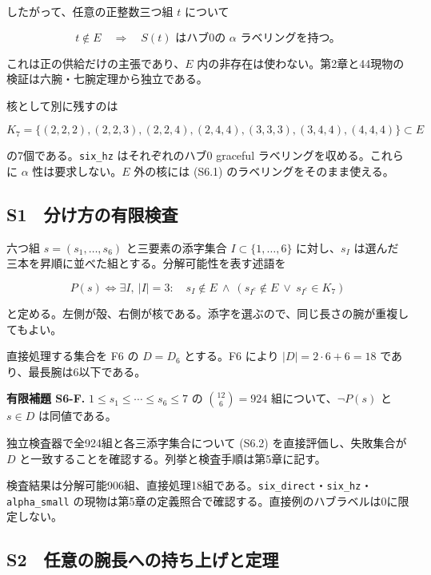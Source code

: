 \documentclass[
  10pt,
  a4paper,
]{article}
\begin{document}
したがって、任意の正整数三つ組 \(t\) について

\[
t\notin E\quad\Longrightarrow\quad
S(t)\text{ はハブ0の }\alpha\text{ ラベリングを持つ。} \tag{S6.1}
\]

これは正の供給だけの主張であり、\(E\)
内の非存在は使わない。第2章と44現物の検証は六腕・七腕定理から独立である。

核として別に残すのは

\[
K_7=\{(2,2,2),(2,2,3),(2,2,4),(2,4,4),
(3,3,3),(3,4,4),(4,4,4)\}\subset E
\]

の7個である。\texttt{six\_hz} はそれぞれのハブ0 graceful
ラベリングを収める。これらに \(\alpha\) 性は要求しない。\(E\) 外の核には
(S6.1) のラベリングをそのまま使える。

\subsection{S1　分け方の有限検査}\label{s1-ux5206ux3051ux65b9ux306eux6709ux9650ux691cux67fb}

六つ組 \(s=(s_1,\ldots,s_6)\) と三要素の添字集合
\(I\subset\{1,\ldots,6\}\) に対し、\(s_I\)
は選んだ三本を昇順に並べた組とする。分解可能性を表す述語を

\[
P(s)\iff\exists I,\ |I|=3:\quad
s_I\notin E\ \land\ (s_{I^c}\notin E\ \lor\ s_{I^c}\in K_7) \tag{S6.2}
\]

と定める。左側が殻、右側が核である。添字を選ぶので、同じ長さの腕が重複してもよい。

直接処理する集合を F6 の \(D=D_6\) とする。F6 により
\(|D|=2\cdot6+6=18\) であり、最長腕は6以下である。

\textbf{有限補題 S6-F.} \(1\le s_1\le\cdots\le s_6\le7\) の
\(\binom{12}{6}=924\) 組について、\(\neg P(s)\) と \(s\in D\)
は同値である。

独立検査器で全924組と各三添字集合について (S6.2)
を直接評価し、失敗集合が \(D\)
と一致することを確認する。列挙と検査手順は第5章に記す。

検査結果は分解可能906組、直接処理18組である。\texttt{six\_direct}・\texttt{six\_hz}・\texttt{alpha\_small}
の現物は第5章の定義照合で確認する。直接例のハブラベルは0に限定しない。

\subsection{S2　任意の腕長への持ち上げと定理}\label{s2-ux4efbux610fux306eux8155ux9577ux3078ux306eux6301ux3061ux4e0aux3052ux3068ux5b9aux7406}
\end{document}
